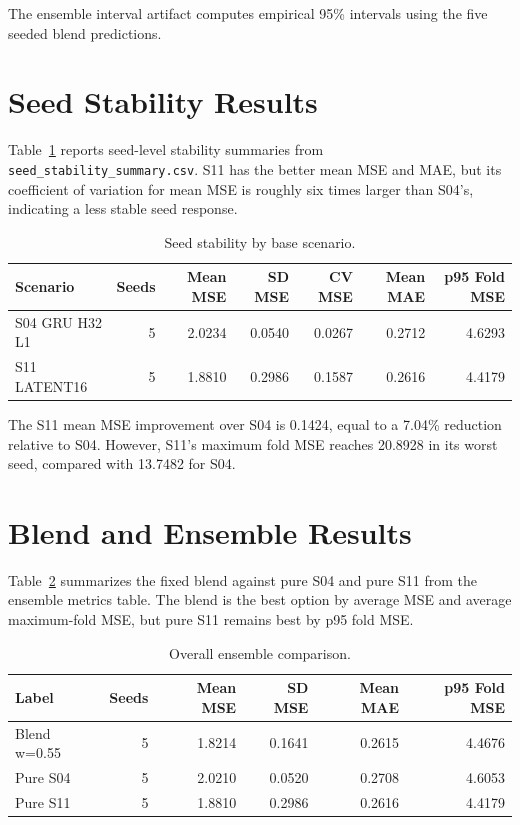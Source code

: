 \documentclass[11pt]{article}
\begin{document}
The ensemble interval artifact computes empirical 95\% intervals using
the five seeded blend predictions.

\section{Seed Stability Results}

Table~\ref{tab:seed-stability} reports seed-level stability summaries from
\texttt{seed\_stability\_summary.csv}. S11 has the better mean MSE and MAE,
but its coefficient of variation for mean MSE is roughly six times larger
than S04's, indicating a less stable seed response.

\begin{table}[H]
\centering
\caption{Seed stability by base scenario.}
\label{tab:seed-stability}
\begin{tabular}{lrrrrrr}
\toprule
Scenario & Seeds & Mean MSE & SD MSE & CV MSE & Mean MAE & p95 Fold MSE \\
\midrule
S04 GRU H32 L1 & 5 & 2.0234 & 0.0540 & 0.0267 & 0.2712 & 4.6293 \\
S11 LATENT16 & 5 & 1.8810 & 0.2986 & 0.1587 & 0.2616 & 4.4179 \\
\bottomrule
\end{tabular}
\end{table}

The S11 mean MSE improvement over S04 is 0.1424, equal to a 7.04\%
reduction relative to S04. However, S11's maximum fold MSE reaches
20.8928 in its worst seed, compared with 13.7482 for S04.

\section{Blend and Ensemble Results}

Table~\ref{tab:ensemble-overall} summarizes the fixed blend against pure
S04 and pure S11 from the ensemble metrics table. The blend is the best
option by average MSE and average maximum-fold MSE, but pure S11 remains
best by p95 fold MSE.

\begin{table}[H]
\centering
\caption{Overall ensemble comparison.}
\label{tab:ensemble-overall}
\begin{tabular}{lrrrrr}
\toprule
Label & Seeds & Mean MSE & SD MSE & Mean MAE & p95 Fold MSE \\
\midrule
Blend w=0.55 & 5 & 1.8214 & 0.1641 & 0.2615 & 4.4676 \\
Pure S04 & 5 & 2.0210 & 0.0520 & 0.2708 & 4.6053 \\
Pure S11 & 5 & 1.8810 & 0.2986 & 0.2616 & 4.4179 \\
\bottomrule
\end{tabular}
\end{table}
\end{document}
